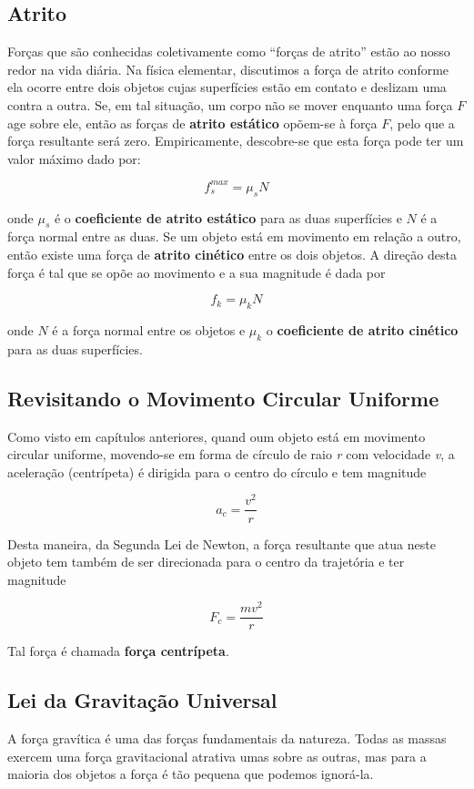 \subsection{Atrito}
Forças que são conhecidas coletivamente como “forças de atrito” estão ao nosso redor na vida diária. Na física elementar, discutimos a força de atrito conforme ela ocorre entre dois objetos cujas
superfícies estão em contato e deslizam uma contra a outra. Se, em tal situação, um corpo não se mover enquanto uma força $F$ age sobre ele, então
as forças de \textbf{atrito estático} opõem-se à força $F$, pelo que a força resultante será zero. Empiricamente,
descobre-se que esta força pode ter um valor máximo dado por:

$$
f_s^{max}=\mu_sN
$$

onde $\mu_s$ é o \textbf{coeficiente de atrito estático} para as duas superfícies e $N$ é a força normal entre as duas.
Se um objeto está em movimento em relação a outro, então existe uma força de \textbf{atrito cinético} entre os dois objetos. A direção desta força é tal que se opõe ao movimento e a sua magnitude é dada por

$$
f_k=\mu_kN
$$

onde $N$ é a força normal entre os objetos e $\mu_k$ o \textbf{coeficiente de atrito cinético} para as duas superfícies.

\subsection{Revisitando o Movimento Circular Uniforme}

Como visto em capítulos anteriores, quand oum objeto está em movimento circular uniforme, movendo-se em forma de círculo de raio \emph{r} com velocidade \emph{v}, a aceleração (centrípeta) é dirigida para o centro do círculo e tem magnitude

\begin{equation}
    a_{c}=\frac{v^2}{r}
\end{equation}

Desta maneira, da Segunda Lei de Newton, a força resultante que atua neste objeto tem também de ser direcionada para o centro da trajetória e ter magnitude

\begin{equation}
    F_{c}=\frac{mv^2}{r}
\end{equation}

Tal força é chamada \textbf{força centrípeta}.

\subsection{Lei da Gravitação Universal}
A força gravítica é uma das forças fundamentais da natureza. Todas as massas exercem uma força gravitacional atrativa umas sobre as outras, mas para a maioria dos objetos a força é tão pequena que podemos ignorá-la.

